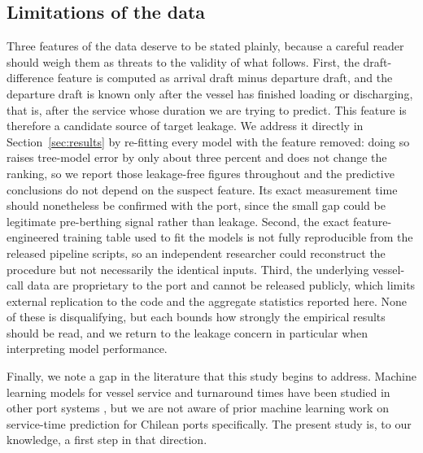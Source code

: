 \subsection{Limitations of the data}\label{sec:datalimits}

Three features of the data deserve to be stated plainly, because a careful reader
should weigh them as threats to the validity of what follows. First, the
draft-difference feature is computed as arrival draft minus departure draft, and the
departure draft is known only after the vessel has finished loading or discharging,
that is, after the service whose duration we are trying to predict. This feature is
therefore a candidate source of target leakage. We address it directly in
Section~\ref{sec:results} by re-fitting every model with the feature removed:
doing so raises tree-model error by only about three percent and does not change
the ranking, so we report those leakage-free figures throughout and the predictive
conclusions do not depend on the suspect feature. Its exact measurement time should
nonetheless be confirmed with the port, since the small gap could be legitimate
pre-berthing signal rather than leakage. Second, the exact
feature-engineered training table used to fit the models is not fully reproducible
from the released pipeline scripts, so an independent researcher could reconstruct
the procedure but not necessarily the identical inputs. Third, the underlying
vessel-call data are proprietary to the port and cannot be released publicly, which
limits external replication to the code and the aggregate statistics reported here.
None of these is disqualifying, but each bounds how strongly the empirical results
should be read, and we return to the leakage concern in particular when interpreting
model performance.

Finally, we note a gap in the literature that this study begins to address. Machine
learning models for vessel service and turnaround times have been studied in other
port systems \citep{yan2024predicting, chu2025vessel}, but we are not aware of prior
machine learning work on service-time prediction for Chilean ports specifically. The
present study is, to our knowledge, a first step in that direction.
